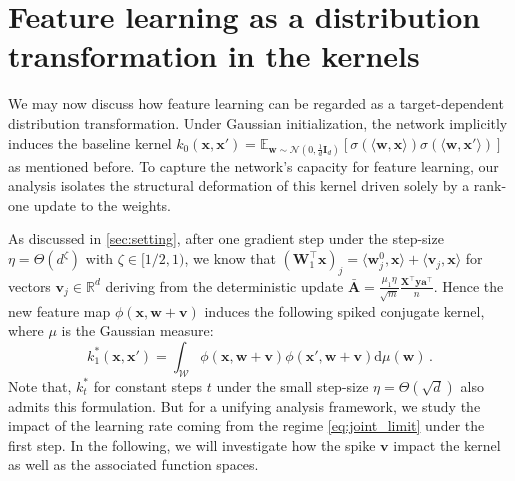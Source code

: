 \section{Feature learning as a distribution transformation in the kernels}\label{sec:three}

We may now discuss how feature learning can be regarded as a target-dependent distribution transformation.
Under Gaussian initialization, the network implicitly induces the baseline kernel $k_0(\bm{x}, \bm{x}') = \mathbb{E}_{\bm{w} \sim \mathcal{N}(0, \frac{1}{d}\bm{I}_d)}[\sigma(\langle\bm{w}, \bm{x}\rangle)\sigma(\langle\bm{w}, \bm{x}'\rangle)]$ as mentioned before. To capture the network's capacity for feature learning, our analysis isolates the structural deformation of this kernel driven solely by a rank-one update to the weights.

As discussed in \cref{sec:setting}, after one gradient step under the step-size $\eta = \Theta(d^{\zeta})$ with $\zeta \in [1/2, 1)$, we know that $(\bm W_1^\top \bm x)_j = \langle\bm w^0_j, \bm x\rangle +  \langle \bm v_j, \bm x\rangle$ for vectors $\bm v_j \in \mathbb R^d$ deriving from the deterministic update $\bar{\bm A} = \frac{\mu_1\eta}{\sqrt{m}}\frac{\bm X^\top \bm y \bm a^\top}{n}$. Hence the new feature map $\phi \left( \bm x, \bm w + \bm v\right)$ induces the following spiked conjugate kernel, where $\mu$ is the Gaussian measure:
\begin{equation}\label{kernelt}
    k_{1}^*(\bm x, \bm x') = \int_{\mathcal{W}} \phi \left( \bm x, \bm w + \bm v\right)\phi \left( \bm x', \bm w + \bm v\right) \mathrm{d}\mu(\bm w)\,.  
\end{equation}
Note that, $ k_{t}^*$ for constant steps $t$ under the small step-size $\eta=\Theta(\sqrt{d})$ also admits this formulation.
But for a unifying analysis framework, we study the impact of the learning rate coming from the regime \cref{eq:joint_limit} under the first step. %
In the following, we will investigate how the spike $\bm v$ impact the kernel as well as the associated function spaces.

